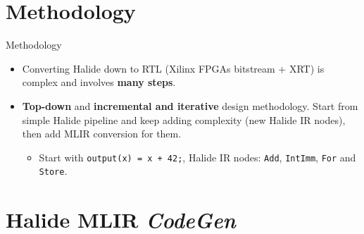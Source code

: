 \documentclass[8pt,a4paper,oneside,hidelinks,aspectratio=169,dvipsnames]{beamer}
\newcommand{\codecpp}[1]{\texttt{#1}}
\begin{document}
\section{Methodology}

\begin{frame}{Methodology}
  \begin{itemize}
    \item Converting Halide down to RTL (Xilinx FPGAs bitstream + XRT) is complex and involves \textbf{many steps}.
    \item \textbf{Top-down} and \textbf{incremental and iterative} design methodology. Start from simple Halide pipeline and keep adding complexity (new Halide IR nodes), then add MLIR conversion for them.
          \begin{itemize}
            \item Start with \codecpp{output(x) = x + 42;}, Halide IR nodes: \codecpp{Add}, \codecpp{IntImm}, \codecpp{For} and \codecpp{Store}.
          \end{itemize}
  \end{itemize}
  \begin{figure}
    \centering
    \scalebox{.36}{}
  \end{figure}
\end{frame}

\section{Halide MLIR \textit{CodeGen}}
\end{document}
